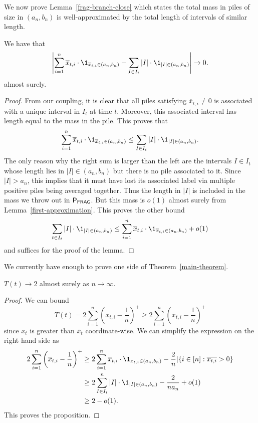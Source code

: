 \documentclass[12pt]{article}
\begin{document}
We now prove Lemma~\ref{frag-branch-close} which states the total mass in piles of size in $(a_n, b_n)$ is well-approximated by the total length of intervals of similar length. 
\begin{lem} \label{frag-branch-close}
	We have that
	\[
		\left | \sum_{i = 1}^n \overline{x}_{t, i} \cdot \1_{\overline{x}_{t, i} \in (a_n, b_n)} - \sum_{I \in I_t} |I| \cdot \1_{|I| \in (a_n, b_n)} \right | \to 0. 
	\]
	almost surely. 
\end{lem}	
\begin{proof}
	From our coupling, it is clear that all piles satisfying $\overline{x}_{t, i} \neq 0$ is associated with a unique interval in $I_t$ at time $t$. Moreover, this associated interval has length equal to the mass in the pile. This proves that 
	\[
		\sum_{i = 1}^n \overline{x}_{t, i} \cdot \1_{\overline{x}_{t, i} \in (a_n, b_n)} \leq \sum_{I \in I_t} |I| \cdot \1_{|I| \in (a_n, b_n)}.
	\] 
	The only reason why the right sum is larger than the left are the intervals $I \in I_t$ whose length lies in $|I| \in (a_n, b_n)$ but there is no pile associated to it. Since $|I| > a_n$, this implies that it must have lost its associated label via multiple positive piles being averaged together. Thus the length in $|I|$ is included in the mass we throw out in $\mathsf{P}_{\mathsf{FRAG}}$. But this mass is $o(1)$ almost surely from Lemma~\ref{first-approximation}. This proves the other bound
	\[
		\sum_{t \in I_t} |I| \cdot \1_{|I| \in (a_n, b_n)} \leq \sum_{i = 1}^n \overline{x}_{t, i} \cdot \1_{\overline{x}_{t, i} \in (a_n, b_n)} + o(1) 
	\]
	and suffices for the proof of the lemma. 
\end{proof}

We currently have enough to prove one side of Theorem~\ref{main-theorem}.

\begin{prop}
	$T(t) \to 2$ almost surely as $n \to \infty$. 
\end{prop}
\begin{proof}
	We can bound
	\[
		T(t) = 2 \sum_{i = 1}^n \left ( x_{t, i} - \frac{1}{n} \right )^+ \geq 2 \sum_{i = 1}^n \left ( \overline{x}_{t, i} - \frac{1}{n} \right )^+
	\]
	since $x_t$ is greater than $\overline{x}_t$ coordinate-wise. We can simplify the expression on the right hand side as
	\begin{align*}
		2 \sum_{i = 1}^n \left ( \overline{x}_{t, i} - \frac{1}{n} \right )^+ & \geq 2 \sum_{i = 1}^n \overline{x}_{t, i} \cdot \1_{x_{t, i} \in (a_n, b_n)} - \frac{2}{n} | \{ i \in [n] : \overline{x_{t, i}} > 0\} \\
		& \geq 2 \sum_{I \in I_t}^n |I| \cdot \1_{|I| \in (a_n, b_n)} - \frac{2}{n a_n} + o(1) \\
		& \geq 2 - o(1).
	\end{align*}
	This proves the proposition. 
\end{proof}
\end{document}
